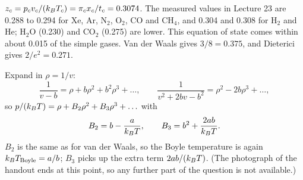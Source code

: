  $z_c = p_cv_c/(k_{B} T_c) = \pi_cx_c/t_c = 0.3074$. The measured values in Lecture 23 are 0.288 to 0.294
for Xe, Ar, N$_2$, O$_2$, CO and CH$_4$, and 0.304 and 0.308 for H$_2$ and He; H$_2$O (0.230) and CO$_2$ (0.275) are
lower. This equation of state comes within about 0.015 of the simple gases. Van der Waals gives $3/8 = 0.375$, and
Dieterici gives $2/e^2 = 0.271$.

 Expand in $\rho = 1/v$:
\begin{equation}
  \frac{1}{v-b} = \rho+b\rho^2+b^2\rho^3+\ldots,\qquad
  \frac{1}{v^2+2bv-b^2} = \rho^2-2b\rho^3+\ldots ,
\end{equation}
so $p/(k_{B} T) = \rho+B_2\rho^2+B_3\rho^3+\ldots$ with
\begin{equation}
  B_2 = b-\frac{a}{k_{B} T},\qquad B_3 = b^2+\frac{2ab}{k_{B} T}.
\end{equation}
$B_2$ is the same as for van der Waals, so the Boyle temperature is again $k_{B} T_{\text{Boyle}} = a/b$; $B_3$ picks up
the extra term $2ab/(k_{B} T)$. (The photograph of the handout ends at this point, so any further part of the question
is not available.)
